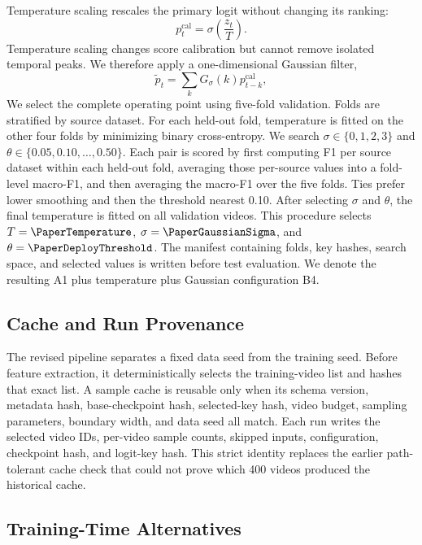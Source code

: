 Temperature scaling rescales the primary logit without changing its ranking:
\begin{equation}
    p_t^{\mathrm{cal}}=\sigma\left(\frac{z_t}{T}\right).
\end{equation}
Temperature scaling changes score calibration but cannot remove isolated
temporal peaks. We therefore apply a one-dimensional Gaussian filter,
\begin{equation}
    \tilde p_t=\sum_k G_{\sigma}(k)p_{t-k}^{\mathrm{cal}},
\end{equation}
We select the complete operating point using five-fold validation. Folds are
stratified by source dataset. For each held-out fold, temperature is fitted on
the other four folds by minimizing binary cross-entropy. We search
$\sigma\in\{0,1,2,3\}$ and
$\theta\in\{0.05,0.10,\ldots,0.50\}$. Each pair is scored by first computing
F1 per source dataset within each held-out fold, averaging those per-source
values into a fold-level macro-F1, and then averaging the macro-F1 over the
five folds. Ties prefer lower smoothing and then the
threshold nearest 0.10. After selecting $\sigma$ and $\theta$, the final
temperature is fitted on all validation videos. This procedure selects
$T=\PaperTemperature$, $\sigma=\PaperGaussianSigma$, and
$\theta=\PaperDeployThreshold$. The manifest containing folds, key hashes,
search space, and selected values is written before test evaluation. We denote
the resulting A1 plus temperature plus Gaussian configuration B4.

\subsection{Cache and Run Provenance}

The revised pipeline separates a fixed data seed from the training seed.
Before feature extraction, it deterministically selects the training-video
list and hashes that exact list. A sample cache is reusable only when its schema
version, metadata hash, base-checkpoint hash, selected-key hash, video budget,
sampling parameters, boundary width, and data seed all match. Each run writes
the selected video IDs, per-video sample counts, skipped inputs, configuration,
checkpoint hash, and logit-key hash. This strict identity replaces the earlier
path-tolerant cache check that could not prove which 400 videos produced the
historical cache.

\subsection{Training-Time Alternatives}

